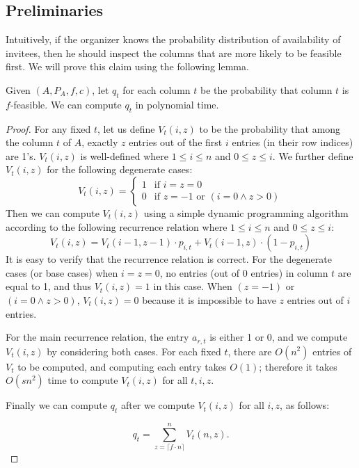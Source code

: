\subsection{Preliminaries}
	Intuitively, if the organizer knows the probability distribution of availability of invitees, then he should inspect the columns that are more likely to be feasible first. We will prove this claim using the following lemma.
	\begin{lemma} \label{bdoodle:lemma:q_t_polytime}
	Given $(A, P_A, f, c)$, let $q_t$ for each column $t$ be the probability that column $t$ is $f$-feasible.
	We can compute $q_t$ in polynomial time.
	\end{lemma}
	\begin{proof}
	For any fixed $t$, let us define $V_t(i, z)$ to be the probability that among the column $t$ of $A$, exactly $z$ entries out of the first $i$ entries (in their row indices) are 1's. $V_t(i, z)$ is well-defined where $1 \leq i \leq n$ and $0 \leq z \leq i$. We further define $V_t(i, z)$ for the following degenerate cases:
	\begin{equation*}
	V_t(i, z) =
	\begin{cases}
		1 & \mbox{if~} i = z = 0 \\
		0 & \mbox{if~} z = -1 \mbox{~or~} (i = 0 \land z > 0)
	\end{cases}
	\end{equation*}
	Then we can compute $V_t(i, z)$ using a simple dynamic programming algorithm according to the following recurrence relation where $1 \leq i \leq n$ and $0 \leq z \leq i$:
	\begin{equation} \label{bdoodle:eqn:vt_precompute}
	V_t(i, z) = V_t(i-1, z-1) \cdot p_{i,t} + V_t(i-1, z) \cdot (1- p_{i,t})
	\end{equation}
	It is easy to verify that the recurrence relation is correct.
	For the degenerate cases (or base cases) when $i = z = 0$, no entries (out of $0$ entries) in column $t$ are equal to 1, and thus $V_t(i, z) = 1$ in this case. When $(z = -1)$ or $(i=0 \land z>0)$, $V_t(i, z) = 0$ because it is impossible to have $z$ entries out of $i$ entries.

	For the main recurrence relation, the entry $a_{r, t}$ is either 1 or 0, and we compute $V_t(i, z)$ by considering both cases. For each fixed $t$, there are $O(n^2)$ entries of $V_t$ to be computed, and computing each entry takes $O(1)$; therefore it takes $O(sn^2)$ time to compute $V_t(i, z)$ for all $t, i, z$.

	Finally we can compute $q_t$ after we compute $V_t(i, z)$ for all $i,z$, as follows:
	
	$$q_t = \sum_{z = \lceil f \cdot n \rceil}^{n} V_t(n, z).$$
	\end{proof}

